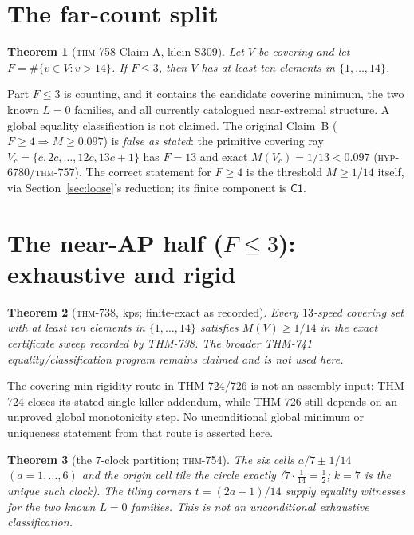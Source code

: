 \documentclass[11pt]{article}
\newtheorem{theorem}{Theorem}[section]
\theoremstyle{definition}
\begin{document}
\section{The far-count split}\label{sec:split}

\begin{theorem}[\textsc{thm}-758 Claim A, klein-S309]\label{thm:split}
Let $V$ be covering and let $F=\#\{v\in V: v>14\}$. If $F\le 3$, then $V$ has at least ten
elements in $\{1,\dots,14\}$.
\end{theorem}

Part $F\le3$ is counting, and it contains the candidate covering minimum, the two known
$L=0$ families, and all currently catalogued near-extremal structure. A global
equality classification is not claimed. The original Claim~B ($F\ge 4\Rightarrow M\ge 0.097$) is
\emph{false as stated}: the primitive covering ray $V_c=\{c,2c,\dots,12c,13c+1\}$ has
$F=13$ and exact $M(V_c)=1/13<0.097$ (\textsc{hyp}-6780/\textsc{thm}-757). The correct
statement for $F\ge4$ is the threshold $M\ge 1/14$ itself, via
Section~\ref{sec:loose}'s reduction; its finite component is $\mathsf{C1}$.

\section{The near-AP half ($F\le 3$): exhaustive and rigid}\label{sec:nearAP}

\begin{theorem}[\textsc{thm}-738, kps; finite-exact as recorded]\label{thm:boxes}
Every $13$-speed covering set with at least ten elements in $\{1,\dots,14\}$ satisfies
$M(V)\ge 1/14$ in the exact certificate sweep recorded by THM-738. The broader
THM-741 equality/classification program remains claimed and is not used here.
\end{theorem}

The covering-min rigidity route in THM-724/726 is not an assembly input:
THM-724 closes its stated single-killer addendum, while THM-726 still depends on
an unproved global monotonicity step. No unconditional global minimum or
uniqueness statement from that route is asserted here.

\begin{theorem}[the $7$-clock partition; \textsc{thm}-754]\label{thm:sevenclock}
The six cells $a/7\pm 1/14$ $(a=1,\dots,6)$ and the origin cell tile the circle exactly
($7\cdot\frac1{14}=\frac12$; $k=7$ is the unique such clock). The tiling corners
$t=(2a+1)/14$ supply equality witnesses for the two known $L=0$ families. This is not an
unconditional exhaustive classification.
\end{theorem}
\end{document}
